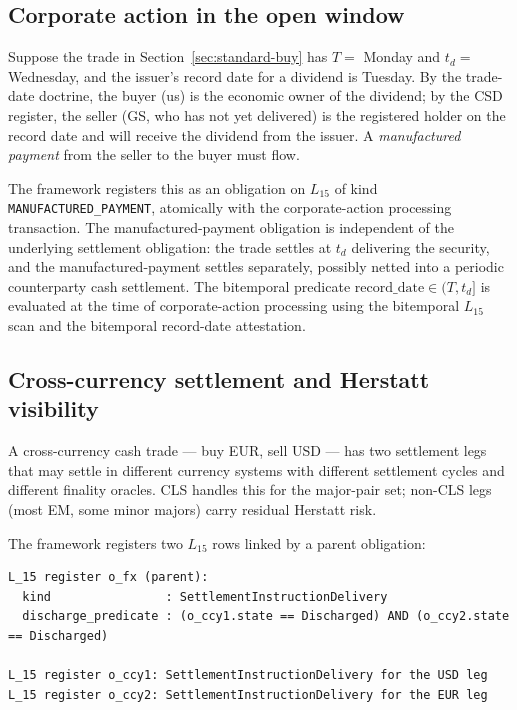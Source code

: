 \documentclass[11pt,a4paper]{article}
\begin{document}
\subsection{Corporate action in the open window}
\label{sec:composition-corp-action}

Suppose the trade in Section~\ref{sec:standard-buy} has $T = $ Monday and $t_d = $ Wednesday, and the issuer's record date for a dividend is Tuesday. By the trade-date doctrine, the buyer (us) is the economic owner of the dividend; by the CSD register, the seller (GS, who has not yet delivered) is the registered holder on the record date and will receive the dividend from the issuer. A \emph{manufactured payment} from the seller to the buyer must flow.

The framework registers this as an obligation on $L_{15}$ of kind \texttt{MANUFACTURED\_PAYMENT}, atomically with the corporate-action processing transaction. The manufactured-payment obligation is independent of the underlying settlement obligation: the trade settles at $t_d$ delivering the security, and the manufactured-payment settles separately, possibly netted into a periodic counterparty cash settlement. The bitemporal predicate $\mathrm{record\_date} \in (T, t_d]$ is evaluated at the time of corporate-action processing using the bitemporal $L_{15}$ scan and the bitemporal record-date attestation.

\subsection{Cross-currency settlement and Herstatt visibility}
\label{sec:composition-fx}

A cross-currency cash trade --- buy EUR, sell USD --- has two settlement legs that may settle in different currency systems with different settlement cycles and different finality oracles. CLS handles this for the major-pair set; non-CLS legs (most EM, some minor majors) carry residual Herstatt risk.

The framework registers two $L_{15}$ rows linked by a parent obligation:

\begin{lstlisting}
L_15 register o_fx (parent):
  kind                : SettlementInstructionDelivery
  discharge_predicate : (o_ccy1.state == Discharged) AND (o_ccy2.state == Discharged)

L_15 register o_ccy1: SettlementInstructionDelivery for the USD leg
L_15 register o_ccy2: SettlementInstructionDelivery for the EUR leg
\end{lstlisting}
\end{document}
